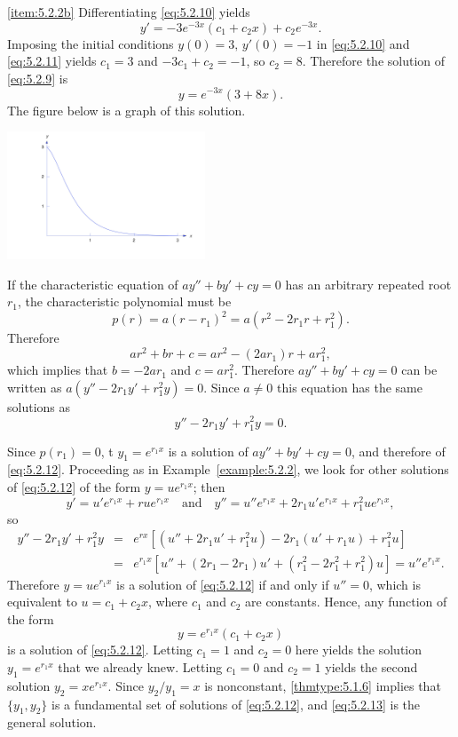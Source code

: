 \documentclass{ximera}
\begin{document}
\begin{example}
\begin{explanation}
\ref{item:5.2.2b}  Differentiating   \eqref{eq:5.2.10} yields
\begin{equation} \label{eq:5.2.11}
y'=-3e^{-3x}(c_1+c_2x)+c_2e^{-3x}.
\end{equation}
Imposing the initial conditions $y(0)=3,\, y'(0)=-1$ in \eqref{eq:5.2.10}
and \eqref{eq:5.2.11} yields $c_1=3$ and $-3c_1+c_2=-1$, so
$c_2=8$. Therefore the solution of \eqref{eq:5.2.9} is
$$
y=e^{-3x}(3+8x).
$$
The figure below is a graph of this solution.
 
\begin{image}
 \includegraphics[height=1.5in]{fig050202.jpg}
\end{image}
 
\end{explanation}
\end{example}
 
 
 
If the characteristic equation of $ay''+by'+cy=0$
has an arbitrary repeated root $r_1$,  the
characteristic polynomial must be
$$
p(r)=a(r-r_1)^2=a(r^2-2r_1r+r_1^2).
$$
Therefore
$$
ar^2+br+c=ar^2-(2ar_1)r+ar_1^2,
$$
which implies that $b=-2ar_1$ and $c=ar_1^2$.
Therefore
 $ay''+by'+cy=0$ can be written as
$a(y''-2r_1y'+r_1^2y)=0$. Since $a\neq 0$ this equation has the same
solutions as
\begin{equation} \label{eq:5.2.12}
y''-2r_1y'+r_1^2y=0.
\end{equation}
 
Since $p(r_1)=0$, t $y_1=e^{r_1x}$ is a solution of
$ay''+by'+cy=0$, and therefore of \eqref{eq:5.2.12}. Proceeding as in
Example~\ref{example:5.2.2}, we look for other solutions of \eqref{eq:5.2.12}
of the form $y=ue^{r_1x}$; then
$$
y'=u'e^{r_1x}+rue^{r_1x}\quad\mbox{and}\quad
y''=u''e^{r_1x}+2r_1u'e^{r_1x}+r_1^2ue^{r_1x},
$$
so
\begin{eqnarray*}
y''-2r_1y'+r_1^2y&=&e^{rx}\left[(u''+2r_1u'+r_1^2u)-
2r_1(u'+r_1u)+r_1^2u\right]\\
&=&e^{r_1x}\left[u''+(2r_1-2r_1)u'+(r_1^2-2r_1^2+r_1^2)u\right]=u''e^{r_1x}.
\end{eqnarray*}
Therefore $y=ue^{r_1x}$ is a solution of \eqref{eq:5.2.12} if and only if
$u''=0$, which is equivalent to $u=c_1+c_2x$, where $c_1$ and $c_2$
are constants. Hence, any function of the form
\begin{equation} \label{eq:5.2.13}
y=e^{r_1x}(c_1+c_2x)
\end{equation}
is  a solution of \eqref{eq:5.2.12}.
Letting $c_1=1$ and $c_2=0$ here yields the solution
 $y_1=e^{r_1x}$ that we already knew. Letting $c_1=0$ and $c_2=1$
yields the second solution $y_2=xe^{r_1x}$. Since
$y_2/y_1=x$
is nonconstant, \ref{thmtype:5.1.6} implies that   $\{y_1,y_2\}$ is
a fundamental set of solutions of \eqref{eq:5.2.12}, and \eqref{eq:5.2.13}
is the general solution.
 
\end{document}
